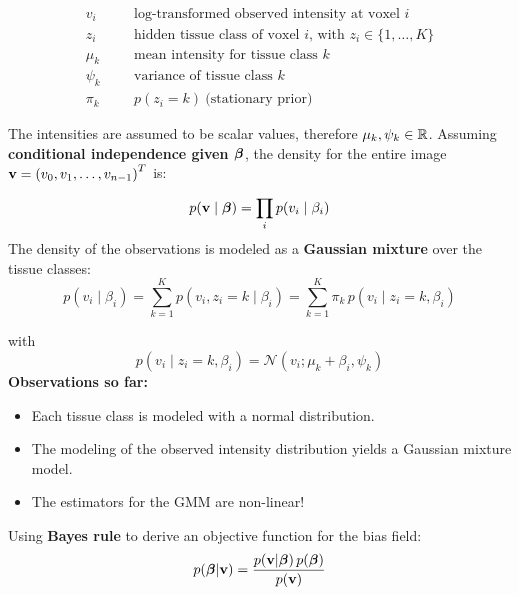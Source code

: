   \begin{eqnarray*}
    v_i      &\phantom{=}& \mbox{log-transformed observed intensity at voxel $i$} \\
    z_i      &\phantom{=}& \mbox{hidden tissue class of voxel $i$, with $z_i\in\{1,\dots,K\}$} \\
    \mu_k    &\phantom{=}& \mbox{mean intensity for tissue class $k$} \\
    \psi_k   &\phantom{=}& \mbox{variance of tissue class $k$} \\
    \pi_k      &\phantom{=}& p(z_i=k) \ \mbox{(stationary prior)}
  \end{eqnarray*}

  The intensities are assumed to be scalar values, therefore $\mu_k, \psi_k \in \mathbb{R}$.
  Assuming \textbf{conditional independence given $\bm{\mathrm{\beta}}$}, the density for the entire image $\bm{\mathrm{v}} = \left(v_0, v_1, \ldots, v_{n-1} \right)^T$ is:
  
  \begin{displaymath}
    p(\bm{\mathrm{v}} \mid \bm{\mathrm{\beta}}) = \prod_i p(v_i \mid \beta_i)
  \end{displaymath}
  The density of the observations is modeled as a \textbf{Gaussian mixture} over the tissue classes:
  \begin{displaymath}
    p(v_i \mid \beta_i) = \sum_{k=1}^K p(v_i, z_i=k \mid \beta_i)
    = \sum_{k=1}^K \pi_k \, p(v_i \mid z_i=k, \beta_i)
  \end{displaymath}

  with
  \begin{displaymath}
    p(v_i \mid z_i=k, \beta_i) = {\mathcal N}(v_i ; \mu_k + \beta_i, \psi_k)
  \end{displaymath}
  \textbf{Observations so far:}

  \begin{itemize}
    \item Each tissue class is modeled with a normal distribution.
    \item The modeling of the observed intensity distribution yields a Gaussian mixture model.
    \item The estimators for the GMM are non-linear!
  \end{itemize}
   Using   \textbf{Bayes rule} to derive an objective function for the bias field:
  \begin{displaymath}
    p(\bm{\mathrm{\beta}} | \bm{\mathrm{v}}) = \frac{p(\bm{\mathrm{v}} | \bm{\mathrm{\beta}}) \, p(\bm{\mathrm{\beta}})} {p(\bm{\mathrm{v}})}
  \end{displaymath}
 

